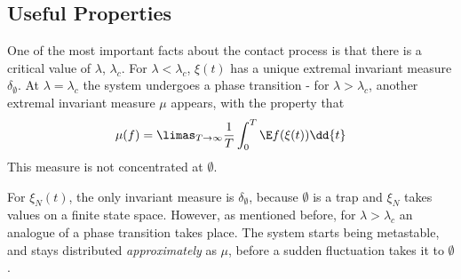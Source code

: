\documentclass{scrartcl}
\begin{document}
\subsection{Useful Properties} \label{useful_properties}

One of the most important facts about the contact process is that there is a critical value of $\lambda$, $\lambda_{c}$. For $\lambda < \lambda_{c}$, $\xi(t)$ has a unique 
extremal invariant measure $\delta_{\emptyset}$. At $\lambda = \lambda_{c}$ the system undergoes a phase transition - for $\lambda > \lambda_{c}$, another extremal invariant 
measure $\mu$ appears, with the property that
\[ \mu(f) = \limas_{T \to \infty} \frac{1}{T} \int_{0}^{T} \E f(\xi(t)) \dd{t} \]
This measure is not concentrated at $\emptyset$.

For $\xi_{N}(t)$, the only invariant measure is $\delta_{\emptyset}$, because $\emptyset$ is a trap and $\xi_{N}$ takes values on a finite state space. 
However, as mentioned before, for $\lambda > \lambda_{c}$ an analogue of a phase transition takes place. The system starts being metastable, and stays distributed
\emph{approximately} as $\mu$, before a sudden fluctuation takes it to $\emptyset$.

%
%
%
%
%
\end{document}
